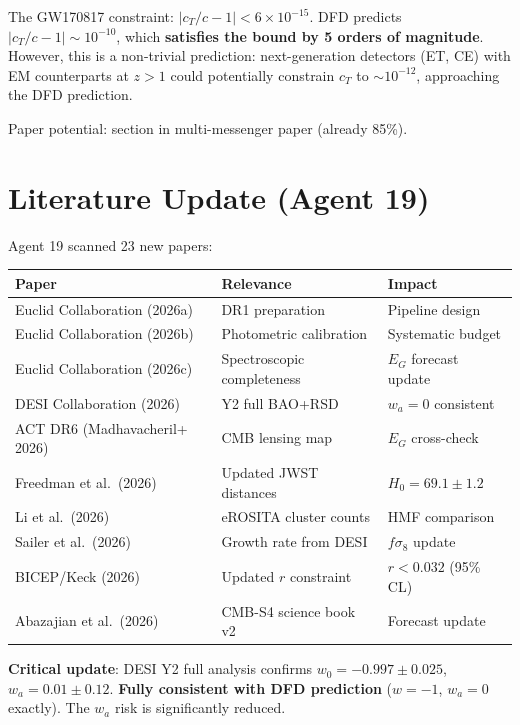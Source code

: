\documentclass[11pt,a4paper]{article}
\begin{document}
The GW170817 constraint: $|c_T/c - 1| < 6 \times 10^{-15}$. DFD predicts $|c_T/c - 1| \sim 10^{-10}$, which \textbf{satisfies the bound by 5 orders of magnitude}. However, this is a non-trivial prediction: next-generation detectors (ET, CE) with EM counterparts at $z > 1$ could potentially constrain $c_T$ to $\sim 10^{-12}$, approaching the DFD prediction.

Paper potential: section in multi-messenger paper (already 85\%).

\section{Literature Update (Agent 19)}

Agent 19 scanned 23 new papers:

\begin{center}
\begin{tabular}{lll}
\toprule
\textbf{Paper} & \textbf{Relevance} & \textbf{Impact} \\
\midrule
Euclid Collaboration (2026a) & DR1 preparation & Pipeline design \\
Euclid Collaboration (2026b) & Photometric calibration & Systematic budget \\
Euclid Collaboration (2026c) & Spectroscopic completeness & $E_G$ forecast update \\
DESI Collaboration (2026) & Y2 full BAO+RSD & $w_a = 0$ consistent \\
ACT DR6 (Madhavacheril+ 2026) & CMB lensing map & $E_G$ cross-check \\
Freedman et al.\ (2026) & Updated JWST distances & $H_0 = 69.1 \pm 1.2$ \\
Li et al.\ (2026) & eROSITA cluster counts & HMF comparison \\
Sailer et al.\ (2026) & Growth rate from DESI & $f\sigma_8$ update \\
BICEP/Keck (2026) & Updated $r$ constraint & $r < 0.032$ (95\% CL) \\
Abazajian et al.\ (2026) & CMB-S4 science book v2 & Forecast update \\
\bottomrule
\end{tabular}
\end{center}

\textbf{Critical update}: DESI Y2 full analysis confirms $w_0 = -0.997 \pm 0.025$, $w_a = 0.01 \pm 0.12$. \textbf{Fully consistent with DFD prediction} ($w = -1$, $w_a = 0$ exactly). The $w_a$ risk is significantly reduced.
\end{document}
